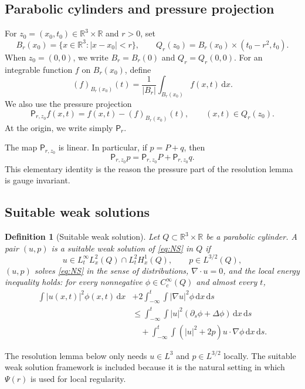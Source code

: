 \documentclass[11pt]{article}
\numberwithin{equation}{section}
\newtheorem{definition}[theorem]{Definition}
\newcommand{\R}{\mathbb R}
\newcommand{\dx}{\,\mathrm dx}
\newcommand{\dxds}{\,\mathrm dx\,\mathrm ds}
\newcommand{\Pf}{\mathsf P}
\begin{document}
\subsection{Parabolic cylinders and pressure projection}

For $z_0=(x_0,t_0)\in\R^3\times\R$ and $r>0$, set
\[
B_r(x_0)=\{x\in\R^3: |x-x_0|<r\},
\qquad
Q_r(z_0)=B_r(x_0)\times(t_0-r^2,t_0).
\]
When $z_0=(0,0)$, we write $B_r=B_r(0)$ and $Q_r=Q_r(0,0)$.
For an integrable function $f$ on $B_r(x_0)$, define
\[
(f)_{B_r(x_0)}(t)=\frac{1}{|B_r|}\int_{B_r(x_0)} f(x,t)\dx.
\]
We also use the pressure projection
\begin{equation}\label{eq:pressure-projection}
\Pf_{r,z_0} f(x,t)=f(x,t)-(f)_{B_r(x_0)}(t),
\qquad (x,t)\in Q_r(z_0).
\end{equation}
At the origin, we write simply $\Pf_r$.

The map $\Pf_{r,z_0}$ is linear.  In particular, if $p=P+q$, then
\begin{equation}\label{eq:pressure-projection-linearity}
\Pf_{r,z_0}p=\Pf_{r,z_0}P+\Pf_{r,z_0}q.
\end{equation}
This elementary identity is the reason the pressure part of the resolution lemma is gauge invariant.

\subsection{Suitable weak solutions}

\begin{definition}[Suitable weak solution]
Let $Q\subset\R^3\times\R$ be a parabolic cylinder.  A pair $(u,p)$ is a suitable weak solution of \eqref{eq:NS} in $Q$ if
\[
u\in L_t^\infty L_x^2(Q)\cap L_t^2H_x^1(Q),
\qquad
p\in L^{3/2}(Q),
\]
$(u,p)$ solves \eqref{eq:NS} in the sense of distributions, $\nabla\cdot u=0$, and the local energy inequality holds: for every nonnegative $\phi\in C_c^\infty(Q)$ and almost every $t$,
\begin{align}
\int |u(x,t)|^2\phi(x,t)\dx
&+2\int_{-\infty}^{t}\int |\nabla u|^2\phi\dxds
\nonumber\\
&\le
\int_{-\infty}^{t}\int |u|^2(\partial_s\phi+\Delta\phi)\dxds
\nonumber\\
&\quad+
\int_{-\infty}^{t}\int (|u|^2+2p)u\cdot\nabla\phi\dxds.
\end{align}
\end{definition}

The resolution lemma below only needs $u\in L^3$ and $p\in L^{3/2}$ locally.  The suitable weak solution framework is included because it is the natural setting in which $\Psi(r)$ is used for local regularity.
\end{document}

